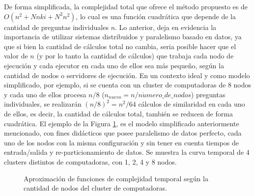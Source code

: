 \bigskip De forma simplificada, la complejidad total que ofrece el método propuesto es de \(O(n^2 + Nnki + N^2n^2)\), lo cual es una función cuadrática que depende de la cantidad de preguntas individuales \(n\). Lo anterior, deja en evidencia la importancia de utilizar sistemas distribuidos y paralelismo basado en datos, ya que si bien la cantidad de cálculos total no cambia, seria posible hacer que el valor de \(n\) (y por lo tanto la cantidad de cálculos) que trabaja cada nodo de ejecución y cada ejecutor en cada uno de ellos sea más pequeño, según la cantidad de nodos o servidores de ejecución. En un contexto ideal y como modelo simplificado, por ejemplo, si se cuenta con un cluster de computadoras de \(8\) nodos y cada uno de ellos procesa \(n/8\) (\(n_{nuevo}=n / n\acute{u}mero\_de\_nodos\)) preguntas individuales, se realizarán \((n/8)^2=n^2/64\) cálculos de similaridad en cada uno de ellos, es decir, la cantidad de cálculos total, también se reducen de forma cuadrática. El ejemplo de la Figura \ref{fig:complejidad_temporal_figura}, es el modelo simplificado anteriormente mencionado, con fines didácticos que posee paralelismo de datos perfecto, cada uno de los nodos con la misma configuración y sin tener en cuenta tiempos de entrada/salida y re-particionamiento de datos. Se muestra la curva temporal de 4 clusters distintos de computadoras, con 1, 2, 4 y 8 nodos.

\begin{figure}[h!]
	\centering
	\caption{Aproximación de funciones de complejidad temporal según la cantidad de nodos del cluster de computadoras.}
	\label{fig:complejidad_temporal_figura}
\end{figure}

